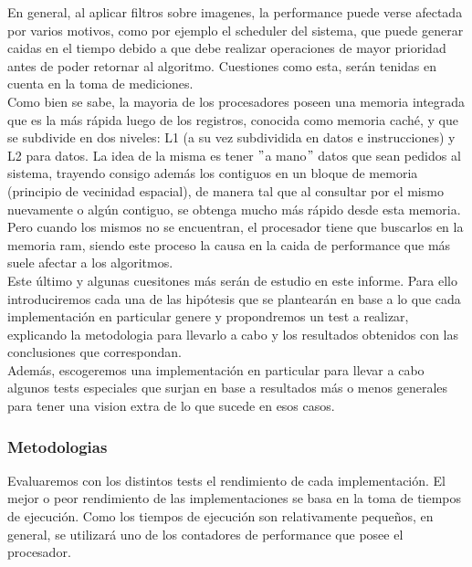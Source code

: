 En general, al aplicar filtros sobre imagenes, la performance puede verse afectada por varios motivos, como por ejemplo el scheduler del sistema, que puede generar caidas en el tiempo debido a que debe realizar operaciones de mayor prioridad antes de poder retornar al algoritmo. Cuestiones como esta, serán tenidas en cuenta en la toma de mediciones.\\

Como bien se sabe, la mayoria de los procesadores poseen una memoria integrada que es la más rápida luego de los registros, conocida como memoria caché, y que se subdivide en dos niveles: L1 (a su vez subdividida en datos e instrucciones) y L2 para datos. 
La idea de la misma es tener $"$a mano$"$ datos que sean pedidos al sistema, trayendo consigo además los contiguos en un bloque de memoria (principio de vecinidad espacial), de manera tal que al consultar por el mismo nuevamente o algún contiguo, se obtenga mucho más rápido desde esta memoria. Pero cuando los mismos no se encuentran, el procesador tiene que buscarlos en la memoria ram, siendo este proceso la causa en la caida de performance que más suele afectar a los algoritmos.\\ 

Este último y algunas cuesitones  más serán de estudio en este informe. Para ello introduciremos cada una de las hipótesis que se plantearán en base a lo que cada implementación en particular genere y propondremos un test a realizar, explicando la metodologia para llevarlo a cabo y los resultados obtenidos con las conclusiones que correspondan.\\
 
Además, escogeremos una implementación en particular para llevar a cabo algunos tests especiales que surjan en base a resultados más o menos generales para tener una vision extra de lo que sucede en esos casos.\\

\subsubsection{Metodologias}

Evaluaremos con los distintos tests el rendimiento de cada implementación. El mejor o peor rendimiento de las implementaciones se basa en la toma de tiempos de ejecución. Como los tiempos de ejecución son relativamente pequeños, en general, se utilizará uno de los contadores de performance que posee el procesador. \\

